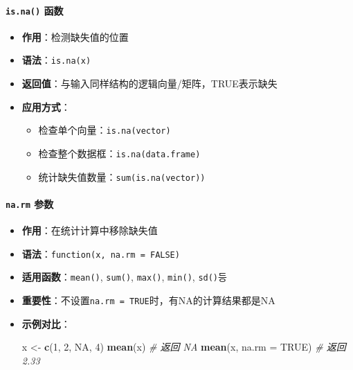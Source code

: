 \documentclass[
  twoside]{book}
\newenvironment{Shaded}{\begin{snugshade}}{\end{snugshade}}
\newcommand{\AttributeTok}[1]{\textcolor[rgb]{0.13,0.29,0.53}{#1}}
\newcommand{\CommentTok}[1]{\textcolor[rgb]{0.56,0.35,0.01}{\textit{#1}}}
\newcommand{\ConstantTok}[1]{\textcolor[rgb]{0.56,0.35,0.01}{#1}}
\newcommand{\DecValTok}[1]{\textcolor[rgb]{0.00,0.00,0.81}{#1}}
\newcommand{\FunctionTok}[1]{\textcolor[rgb]{0.13,0.29,0.53}{\textbf{#1}}}
\newcommand{\NormalTok}[1]{#1}
\newcommand{\OtherTok}[1]{\textcolor[rgb]{0.56,0.35,0.01}{#1}}
\providecommand{\tightlist}{%
  \setlength{\itemsep}{0pt}\setlength{\parskip}{0pt}}
\begin{document}
\hypertarget{is.na-ux51fdux6570}{%
\paragraph{\texorpdfstring{\texttt{is.na()} 函数}{is.na() 函数}}\label{is.na-ux51fdux6570}}

\begin{itemize}
\tightlist
\item
  \textbf{作用}：检测缺失值的位置
\item
  \textbf{语法}：\texttt{is.na(x)}
\item
  \textbf{返回值}：与输入同样结构的逻辑向量/矩阵，TRUE表示缺失
\item
  \textbf{应用方式}：

  \begin{itemize}
  \tightlist
  \item
    检查单个向量：\texttt{is.na(vector)}
  \item
    检查整个数据框：\texttt{is.na(data.frame)}
  \item
    统计缺失值数量：\texttt{sum(is.na(vector))}
  \end{itemize}
\end{itemize}

\hypertarget{na.rm-ux53c2ux6570}{%
\paragraph{\texorpdfstring{\texttt{na.rm} 参数}{na.rm 参数}}\label{na.rm-ux53c2ux6570}}

\begin{itemize}
\item
  \textbf{作用}：在统计计算中移除缺失值
\item
  \textbf{语法}：\texttt{function(x,\ na.rm\ =\ FALSE)}
\item
  \textbf{适用函数}：\texttt{mean()}, \texttt{sum()}, \texttt{max()}, \texttt{min()}, \texttt{sd()}등
\item
  \textbf{重要性}：不设置\texttt{na.rm\ =\ TRUE}时，有NA的计算结果都是NA
\item
  \textbf{示例对比}：

\begin{Shaded}
\begin{Highlighting}[]
\NormalTok{x }\OtherTok{\textless{}{-}} \FunctionTok{c}\NormalTok{(}\DecValTok{1}\NormalTok{, }\DecValTok{2}\NormalTok{, }\ConstantTok{NA}\NormalTok{, }\DecValTok{4}\NormalTok{)}
\FunctionTok{mean}\NormalTok{(x)           }\CommentTok{\# 返回 NA}
\FunctionTok{mean}\NormalTok{(x, }\AttributeTok{na.rm =} \ConstantTok{TRUE}\NormalTok{)  }\CommentTok{\# 返回 2.33}
\end{Highlighting}
\end{Shaded}
\end{itemize}
\end{document}
